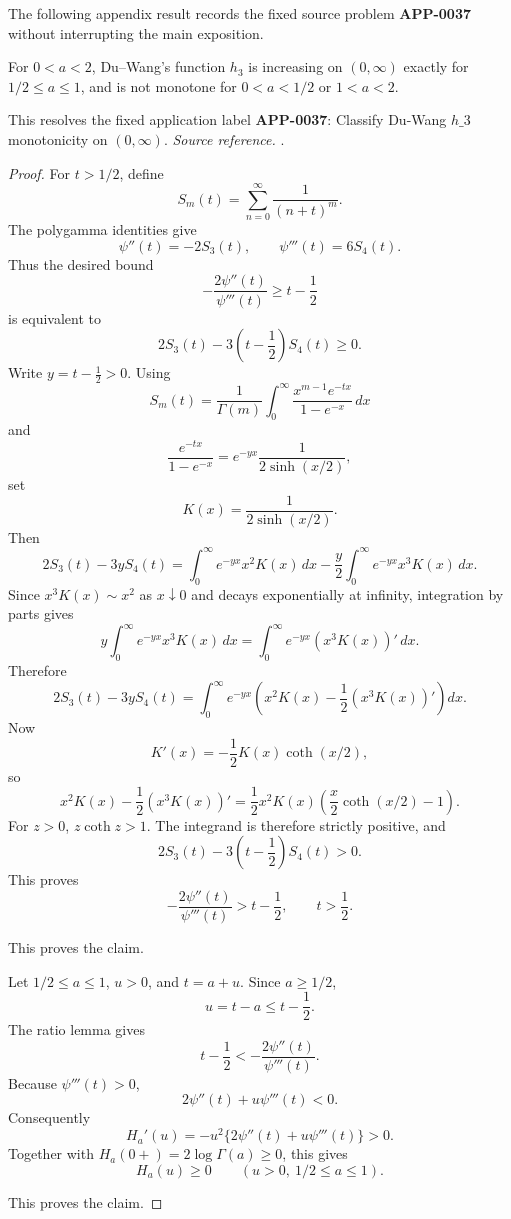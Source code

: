 The following appendix result records the fixed source problem \textbf{APP-0037} without interrupting the main exposition.
\begin{corollary}
\label{res:du-wang-h3-open-problem-2-classification}
For \(0<a<2\), Du--Wang's function \(h_3\) is increasing on \((0,\infty)\) exactly for \(1/2\le a\le1\), and is not monotone for \(0<a<1/2\) or \(1<a<2\).

This resolves the fixed application label \textbf{APP-0037}: Classify Du-Wang \(h\_3\) monotonicity on \((0,\infty)\).
\emph{Source reference.} \cite{app-app-0037-source}.
\end{corollary}
\begin{proof}
For \(t>1/2\), define
\[
S_m(t)=\sum_{n=0}^{\infty}\frac1{(n+t)^m}.
\]
The polygamma identities give
\[
\psi''(t)=-2S_3(t),\qquad \psi'''(t)=6S_4(t).
\]
Thus the desired bound
\[
-\frac{2\psi''(t)}{\psi'''(t)}\ge t-\frac12
\]
is equivalent to
\[
2S_3(t)-3\left(t-\frac12\right)S_4(t)\ge0.
\]
Write \(y=t-\frac12>0\).  Using
\[
S_m(t)=\frac1{\Gamma(m)}
\int_0^\infty \frac{x^{m-1}e^{-tx}}{1-e^{-x}}\,dx
\]
and
\[
\frac{e^{-tx}}{1-e^{-x}}
=e^{-yx}\frac1{2\sinh(x/2)},
\]
set
\[
K(x)=\frac1{2\sinh(x/2)}.
\]
Then
\[
2S_3(t)-3yS_4(t)
=
\int_0^\infty e^{-yx}x^2K(x)\,dx
-\frac y2\int_0^\infty e^{-yx}x^3K(x)\,dx.
\]
Since \(x^3K(x)\sim x^2\) as \(x\downarrow0\) and decays exponentially at
infinity, integration by parts gives
\[
y\int_0^\infty e^{-yx}x^3K(x)\,dx
=
\int_0^\infty e^{-yx}(x^3K(x))'\,dx.
\]
Therefore
\[
2S_3(t)-3yS_4(t)
=
\int_0^\infty e^{-yx}
\left(x^2K(x)-\frac12(x^3K(x))'\right)dx.
\]
Now
\[
K'(x)=-\frac12K(x)\coth(x/2),
\]
so
\[
x^2K(x)-\frac12(x^3K(x))'
=
\frac12x^2K(x)\left(\frac x2\coth(x/2)-1\right).
\]
For \(z>0\), \(z\coth z>1\).  The integrand is therefore strictly positive,
and
\[
2S_3(t)-3\left(t-\frac12\right)S_4(t)>0.
\]
This proves
\[
-\frac{2\psi''(t)}{\psi'''(t)}>t-\frac12,
\qquad t>\frac12.
\]

This proves the claim.

Let \(1/2\le a\le1\), \(u>0\), and \(t=a+u\).  Since \(a\ge1/2\),
\[
u=t-a\le t-\frac12.
\]
The ratio lemma gives
\[
t-\frac12<-\frac{2\psi''(t)}{\psi'''(t)}.
\]
Because \(\psi'''(t)>0\),
\[
2\psi''(t)+u\psi'''(t)<0.
\]
Consequently
\[
H_a'(u)=-u^2\{2\psi''(t)+u\psi'''(t)\}>0.
\]
Together with \(H_a(0+)=2\log\Gamma(a)\ge0\), this gives
\[
H_a(u)\ge0
\qquad (u>0,\ 1/2\le a\le1).
\]

This proves the claim.


\end{proof}

